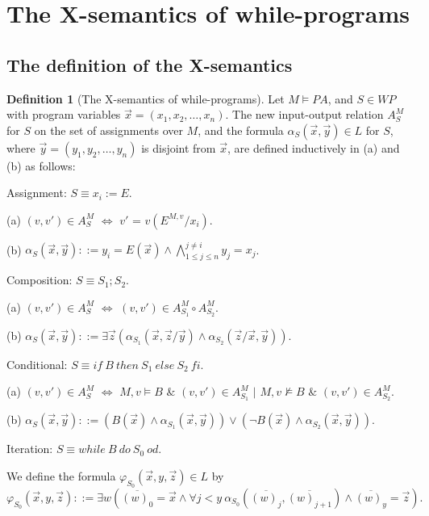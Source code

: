 \documentclass[a4paper,11pt]{article}
\begin{document}
\section{The X-semantics of while-programs}
\subsection{The definition of the X-semantics}

\theoremstyle{definition}
\newtheorem{X_semantics_of_while_programs}{Definition}[subsection]
\begin{X_semantics_of_while_programs}[The X-semantics of while-programs]\label{X_semantics_of_while_programs}
Let $M\models PA$, and $S\in WP$ with program variables $\vec{x} = (x_1,x_2,\ldots,x_n)$. The new input-output relation $A_S^M$ for $S$ on the set of assignments over $M$, and the formula $\alpha_S(\vec{x},\vec{y})\in L$ for $S$, where $\vec{y} = (y_1,y_2,\ldots,y_n)$ is disjoint from $\vec{x}$, are defined inductively in (a) and (b) as follows:

Assignment: $S \equiv x_i := E$.

(a) $(v,v')\in A_S^M$ $\Leftrightarrow$ $v'$ = $v(E^{M,v}/x_i)$.

(b) $\alpha_S(\vec{x},\vec{y}) ::= y_i=E(\vec{x}) \wedge \bigwedge_{1\leq j \leq n}^{j \neq i} y_j=x_j$.

Composition: $S\equiv S_1;S_2$.

(a) $(v,v')\in A_S^M$ $\Leftrightarrow$ $(v,v')\in A_{S_1}^M\circ A_{S_2}^M$.

(b) $\alpha_S(\vec{x},\vec{y}) ::= \exists \vec{z} (\alpha_{S_1}(\vec{x},\vec{z}/\vec{y})\wedge \alpha_{S_2}(\vec{z}/\vec{x},\vec{y}))$.

Conditional: $S\equiv if\ B\ then\ S_1\ else\ S_2\ fi$.

(a) $(v,v')\in A_S^M$ $\Leftrightarrow$ $M,v\models B$ $\&$ $(v,v')\in A_{S_1}^M$ $|$ $M,v\not\models B$ $\&$ $(v,v')\in A_{S_2}^M$.

(b) $\alpha_S(\vec{x},\vec{y}) ::= (B(\vec{x})\wedge \alpha_{S_1}(\vec{x},\vec{y})) \vee (\neg B(\vec{x}) \wedge \alpha_{S_2}(\vec{x},\vec{y}))$.

Iteration: $S\equiv while\ B\ do\ S_0\ od$.

We define the formula $\varphi_{S_0}(\vec{x},y,\vec{z})\in L$ by
\begin{equation*}
\varphi_{S_0}(\vec{x},y,\vec{z}) ::= \exists w ( \overline{(w)_0} = \vec{x} \wedge \forall j<y\ \alpha_{S_0}(\overline{(w)_j},\overline{(w)_{j+1}}) \wedge \overline{(w)_y} = \vec{z} ).
\end{equation*}


\end{X_semantics_of_while_programs}
\end{document}
